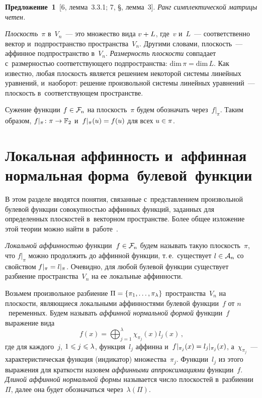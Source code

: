 \begin{multicols}{2}
\smallskip

\noindent
\textbf{Предложение~1}\
[6, лемма~3.3.1; 7, \S{}, лемма~3].
\textit{Ранг симплектической матрицы четен.}


\smallskip

\textit{Плоскость}~$\pi$ в~$V_n$~--- это множество вида $v\hm+L$, где~$v$ и~$L$~--- 
соответственно вектор и~подпространство пространства~$V_n$. Другими словами, 
плоскость~--- аффинное подпространство в~$V_n$.
\textit{Размерность плоскости} совпадает с~размерностью соответствующего 
подпространства: $\mathrm{dim}\,\pi=\mathrm{dim}\,L$.
Как известно, любая плоскость является решением некоторой системы линейных 
уравнений, и~на\-обо\-рот: решение произвольной системы линейных уравнений~--- 
плоскость в~соответствующем пространстве.

Сужение функции $f\hm\in\mathcal{F}_n$ на плоскость~$\pi$ будем обозначать 
через~$f|_{\pi}$. Таким образом, $f|_{\pi}\colon \pi\hm\to\mathbb{F}_2$ 
и~$f|_{\pi}(u)\hm=f(u)$ для всех $u\hm\in\pi$.



\section{Локальная аффинность и~аффинная нормальная форма~булевой~функции}

В этом разделе вводятся понятия, связанные с~представлением произвольной булевой 
функции совокупностью аффинных функций, заданных для определенных плоскостей 
в~векторном пространстве. Более общее изложение этой теории можно найти 
в~работе~\cite{LYaD2007}.

\textit{Локальной аффинностью} функции~$f\hm\in\mathcal{F}_n$ будем называть такую 
плоскость~$\pi$, что $f|_{\pi}$ можно продолжить до аффинной функции, т.\,е.\ 
существует $l\hm\in\mathcal{A}_n$ со свойством $f|_{\pi}\hm=l|_{\pi}$.
Очевидно, для любой булевой функции существует разбиение пространства~$V_n$ на 
ее локальные аффинности.

Возьмем произвольное разбиение $\Pi\hm=\{\pi_1,\ldots,\pi_{\lambda}\}$ 
пространства~$V_n$ на плоскости, являющиеся локальными аффинностями булевой 
функции~$f$ от $n$~переменных.
Будем называть \textit{аффинной нормальной формой} функции~$f$ выражение вида
\begin{equation}
\label{AffNF}
f(x)=\bigoplus_{j=1}^{\lambda}\chi_{\pi_j}(x) l_j(x)\,,
\end{equation}
где для каждого~$j$, $1\hm\leqslant j\hm\leqslant\lambda$, функция~$l_j$ аффинна 
и~$f|_{\pi_j}(x)\hm=l_j|_{\pi_j}(x)$, а~$\chi_{\pi_j}$~--- характеристическая 
функция (индикатор) множества~$\pi_j$.
Функции~$l_j$ из этого выражения для краткости назовем\linebreak
 \textit{аффинными 
аппроксимациями} функции~$f$.
\textit{Длиной аффинной нормальной формы} называется число плоскостей 
в~разбиении~$\Pi$, далее она будет обозначаться через~$\lambda(\Pi)$.


\end{multicols}
